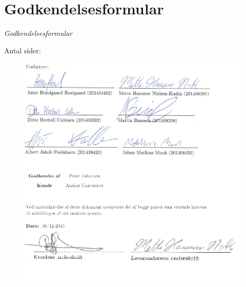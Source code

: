 \chapter{Godkendelsesformular}

{\LARGE\textit{Godkendelsesformular}}

Antal sider:  \pageref{LastPage}

\begin{figure}[H]
	\centering
	\includegraphics[width=1.\textwidth]{Figurer/godkendelsesformular}
\end{figure}




	

